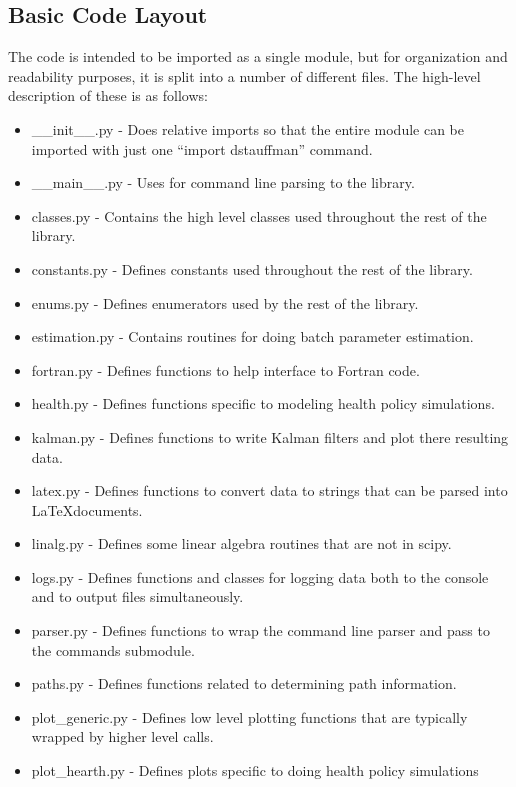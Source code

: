 \documentclass[12pt]{article}
\begin{document}
\subsection{Basic Code Layout}\label{Basic_code_layout}
The code is intended to be imported as a single module, but for organization and readability purposes, it is split into a number of different files.  The high-level description of these is as follows:
\begin{itemize}
    \setlength{\itemsep}{0pt}
    \setlength{\parskip}{0pt}
    \setlength{\parsep}{0pt}
    \item \_\_init\_\_.py - Does relative imports so that the entire module can be imported with just one ``import dstauffman'' command.
    \item \_\_main\_\_.py - Uses for command line parsing to the library.
    \item classes.py - Contains the high level classes used throughout the rest of the library.
    \item constants.py - Defines constants used throughout the rest of the library.
    \item enums.py - Defines enumerators used by the rest of the library.
    \item estimation.py - Contains routines for doing batch parameter estimation.
    \item fortran.py - Defines functions to help interface to Fortran code.
    \item health.py - Defines functions specific to modeling health policy simulations.
    \item kalman.py - Defines functions to write Kalman filters and plot there resulting data.
    \item latex.py - Defines functions to convert data to strings that can be parsed into \LaTeX documents.
    \item linalg.py - Defines some linear algebra routines that are not in scipy.
    \item logs.py - Defines functions and classes for logging data both to the console and to output files simultaneously.
    \item parser.py - Defines functions to wrap the command line parser and pass to the commands submodule.
    \item paths.py - Defines functions related to determining path information.
    \item plot\_generic.py - Defines low level plotting functions that are typically wrapped by higher level calls.
    \item plot\_hearth.py - Defines plots specific to doing health policy simulations

\end{itemize}
\end{document}
